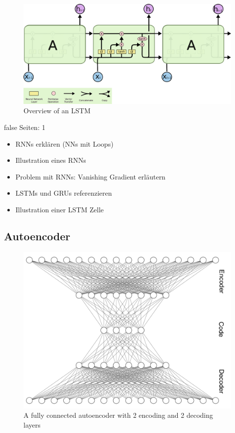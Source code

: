 \documentclass[draft,final,oneside]{vutinfth} %
\begin{document}
\begin{figure}[ht]
	\centering
  	\includegraphics[width=1.0\textwidth]{graphics/lstm.png}
	\caption{Overview of an LSTM \cite{colahlstm}}
	\label{fig:lstm}
\end{figure}



\if false
Seiten: 1
\begin{itemize}

\item RNNs erklären (NNs mit Loops)
\item Illustration eines RNNs
\item Problem mit RNNs: Vanishing Gradient erläutern
\item LSTMs und GRUs referenzieren
\item Illustration einer LSTM Zelle

\end{itemize}
\fi


\subsection{Autoencoder}

\begin{figure}[ht]
	\centering
  	\includegraphics[width=1.0\textwidth]{graphics/autoencoder.png}
	\caption{A fully connected autoencoder with 2 encoding and 2 decoding layers}
	\label{fig:autoencoder}
\end{figure}
\end{document}
